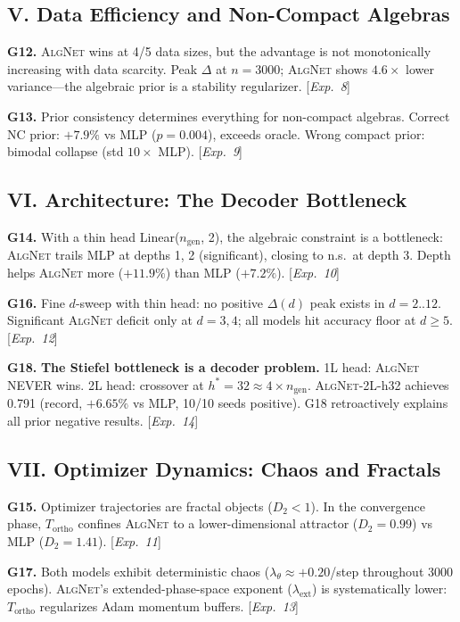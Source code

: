 \documentclass[11pt,a4paper]{article}
\newcommand{\Tortho}{T_{\mathrm{ortho}}}
\newcommand{\ngen}{n_{\mathrm{gen}}}
\newcommand{\AlgNet}{\textsc{AlgNet}}
\theoremstyle{definition}
\begin{document}
\subsection{V. Data Efficiency and Non-Compact Algebras}

\noindent\textbf{G12.} \AlgNet{} wins at 4/5 data sizes, but the advantage is not monotonically 
increasing with data scarcity. Peak $\Delta$ at $n = 3000$; \AlgNet{} shows $4.6\times$ 
lower variance---the algebraic prior is a stability regularizer. [\emph{Exp.~8}]

\noindent\textbf{G13.} Prior consistency determines everything for non-compact algebras. Correct 
NC prior: $+7.9\%$ vs MLP ($p = 0.004$), exceeds oracle. Wrong compact prior: bimodal 
collapse (std $10\times$ MLP). [\emph{Exp.~9}]

\subsection{VI. Architecture: The Decoder Bottleneck}

\noindent\textbf{G14.} With a thin head Linear($\ngen$, 2), the algebraic constraint is a 
bottleneck: \AlgNet{} trails MLP at depths 1, 2 (significant), closing to n.s.\ at 
depth 3. Depth helps \AlgNet{} more ($+11.9\%$) than MLP ($+7.2\%$). [\emph{Exp.~10}]

\noindent\textbf{G16.} Fine $d$-sweep with thin head: no positive $\Delta(d)$ peak exists in 
$d = 2..12$. Significant \AlgNet{} deficit only at $d = 3, 4$; all models hit accuracy 
floor at $d \geq 5$. [\emph{Exp.~12}]

\noindent\textbf{G18.} \textbf{The Stiefel bottleneck is a decoder problem.} 1L head: \AlgNet{} 
NEVER wins. 2L head: crossover at $h^* = 32 \approx 4 \times \ngen$. 
\AlgNet{}-2L-h32 achieves 0.791 (record, $+6.65\%$ vs MLP, 10/10 seeds positive). 
G18 retroactively explains all prior negative results. [\emph{Exp.~14}]

\subsection{VII. Optimizer Dynamics: Chaos and Fractals}

\noindent\textbf{G15.} Optimizer trajectories are fractal objects ($D_2 < 1$). In the 
convergence phase, $\Tortho$ confines \AlgNet{} to a lower-dimensional attractor 
($D_2 = 0.99$) vs MLP ($D_2 = 1.41$). [\emph{Exp.~11}]

\noindent\textbf{G17.} Both models exhibit deterministic chaos ($\lambda_\theta \approx +0.20$/step 
throughout 3000 epochs). \AlgNet{}'s extended-phase-space exponent 
($\lambda_{\mathrm{ext}}$) is systematically lower: $\Tortho$ regularizes Adam 
momentum buffers. [\emph{Exp.~13}]
\end{document}
